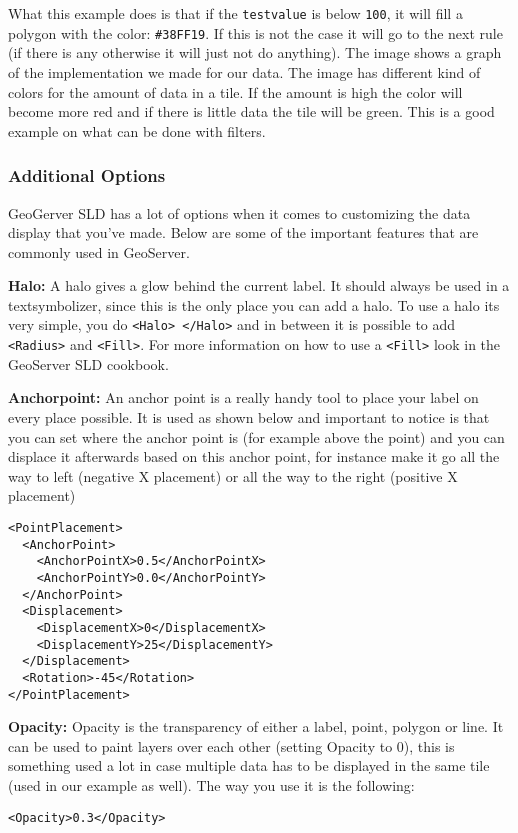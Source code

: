 What this example does is that if the \lstinline|testvalue| is below \lstinline|100|, it will fill a polygon with the color: \lstinline|#38FF19|. If this is not the case it will go to the next rule (if there is any otherwise it will just not do anything). The image shows a graph of the implementation we made for our data. The image has different kind of colors for the amount of data in a tile. If the amount is high the color will become more red and if there is little data the tile will be green. This is a good example on what can be done with filters.

\subsubsection{Additional Options}

GeoGerver SLD has a lot of options when it comes to customizing the data display that you've made. Below are some of the important features that are commonly used in GeoServer.

\textbf{Halo:} A halo gives a glow behind the current label. It should always be used in a textsymbolizer, since this is the only place you can add a halo. To use a halo its very simple, you do \lstinline|<Halo> </Halo>| and in between it is possible to add \lstinline|<Radius>| and \lstinline|<Fill>|. For more information on how to use a \lstinline|<Fill>| look in the GeoServer SLD cookbook.

\textbf{Anchorpoint:} An anchor point is a really handy tool to place your label on every place possible. It is used as shown below and important to notice is that you can set where the anchor point is (for example above the point) and you can displace it afterwards based on this anchor point, for instance make it go all the way to left (negative X placement) or all the way to the right (positive X placement)
\begin{lstlisting}
<PointPlacement>
  <AnchorPoint>
    <AnchorPointX>0.5</AnchorPointX>
    <AnchorPointY>0.0</AnchorPointY>
  </AnchorPoint>
  <Displacement>
    <DisplacementX>0</DisplacementX>
    <DisplacementY>25</DisplacementY>
  </Displacement>
  <Rotation>-45</Rotation>
</PointPlacement>
\end{lstlisting}

\textbf{Opacity:} Opacity is the transparency of either a label, point, polygon or line. It can be used to paint layers over each other (setting Opacity to 0), this is something used a lot in case multiple data has to be displayed in the same tile (used in our example as well). The way you use it is the following:
\begin{lstlisting}
<Opacity>0.3</Opacity>
\end{lstlisting}

